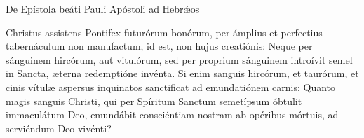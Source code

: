 
De Epístola beáti Pauli Apóstoli ad Hebr\'{\ae}os

Christus assistens Pontifex futurórum bonórum, per ámplius et perfectius tabernáculum non manufactum, id est, non hujus creatiónis:
Neque per sánguinem hircórum, aut vitulórum, sed per proprium sánguinem introívit semel in Sancta, æterna redemptióne invénta.
Si enim sanguis hircórum, et taurórum, et cinis vítulæ aspersus inquinatos sanctificat ad emundatiónem carnis:
Quanto magis sanguis Christi, qui per Spíritum Sanctum semetípsum óbtulit immaculátum Deo, emundábit consciéntiam nostram ab opéribus mórtuis, ad serviéndum Deo vivénti?
\par